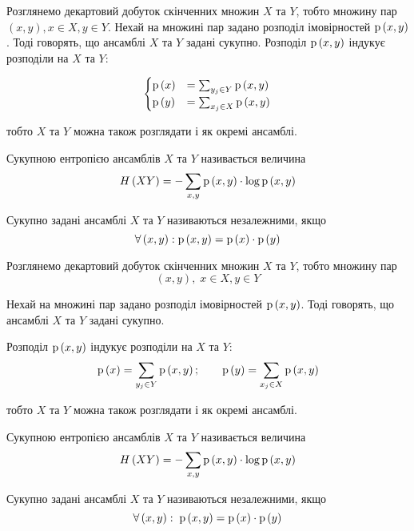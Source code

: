 Розглянемо декартовий добуток скінченних множин $X$ та $Y$, тобто
множину пар  $\left(x, y\right), x\in X, y\in Y$.
Нехай на множині пар задано розподіл
імовірностей  $\mathrm{p}\left(x, y\right)$. Тоді говорять, що ансамблі $X$ та $Y$
задані сукупно. Розподіл  $\mathrm{p}\left(x, y\right)$ індукує розподіли на $X$ та $Y$:

$$\begin{cases}
\mathrm{p}\left(x\right) &= \sum_{y_j \in Y}\mathrm{p}\left(x,y\right) \\
\mathrm{p}\left(y\right) &= \sum_{x_j \in X}\mathrm{p}\left(x,y\right)
\end{cases}$$

тобто $X$ та $Y$ можна також розглядати і як окремі ансамблі.

\begin{definition}
    Сукупною ентропією ансамблів  $X$ та  $Y$ називається величина
    $$H\left( XY \right)=-\sum_{x,y} \mathrm{p}\left(x,y\right) \cdot \log{\mathrm{p}\left(x,y\right)}$$
\end{definition}

\begin{definition}
    Сукупно задані ансамблі $X$ та $Y$ називаються
    незалежними, якщо
    $$\forall \left( x,y \right): \mathrm{p}\left(x,y\right) = \mathrm{p}\left(x\right) \cdot \mathrm{p}\left(y\right)$$
\end{definition}

Розглянемо декартовий добуток скінченних множин $X$ та $Y$, тобто
множину пар
$$\left( x,y \right),\; x\in X,y\in Y$$

\begin{definition}
Нехай на множині пар задано розподіл імовірностей $\mathrm{p}\left(x,y\right)$.
Тоді говорять, що ансамблі $X$ та $Y$ задані сукупно.
\end{definition}

Розподіл  $\mathrm{p}\left(x,y\right)$ індукує розподіли на $X$ та $Y$:
$$\mathrm{p}\left(x\right)=\sum_{y_j \in Y} \mathrm{p}\left(x,y\right);\qquad
    \mathrm{p}\left(y\right)=\sum_{x_j\in X} \mathrm{p}\left(x,y\right)$$

тобто $X$ та $Y$ можна також розглядати і як окремі ансамблі.

\begin{definition}
    Сукупною ентропією ансамблів  $X$ та $Y$ називається величина
    $$H\left( XY \right) = -\sum_{x,y} \mathrm{p}\left(x,y\right) \cdot \log{\mathrm{p}\left(x,y\right)}$$
\end{definition}

\begin{definition}
    Сукупно задані ансамблі $X$ та $Y$ називаються незалежними, якщо
    $$\forall \left( x,y \right):\; \mathrm{p}\left(x,y\right) = \mathrm{p}\left(x\right) \cdot \mathrm{p}\left(y\right)$$
\end{definition}

